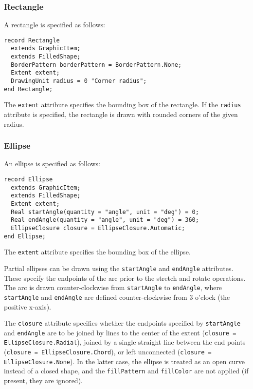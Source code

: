 \subsubsection{Rectangle}\label{rectangle}

A rectangle is specified as follows:
\begin{lstlisting}[language=modelica]
record Rectangle
  extends GraphicItem;
  extends FilledShape;
  BorderPattern borderPattern = BorderPattern.None;
  Extent extent;
  DrawingUnit radius = 0 "Corner radius";
end Rectangle;
\end{lstlisting}%
The \lstinline!extent! attribute specifies the bounding box of the rectangle.
If the \lstinline!radius! attribute is specified, the rectangle is drawn with rounded corners of the given radius.

\subsubsection{Ellipse}\label{ellipse}

An ellipse is specified as follows:
\begin{lstlisting}[language=modelica]
record Ellipse
  extends GraphicItem;
  extends FilledShape;
  Extent extent;
  Real startAngle(quantity = "angle", unit = "deg") = 0;
  Real endAngle(quantity = "angle", unit = "deg") = 360;
  EllipseClosure closure = EllipseClosure.Automatic;
end Ellipse;
\end{lstlisting}%
The \lstinline!extent! attribute specifies the bounding box of the ellipse.

Partial ellipses can be drawn using the \lstinline!startAngle! and \lstinline!endAngle! attributes.
These specify the endpoints of the arc prior to the stretch and rotate operations.
The arc is drawn counter-clockwise from \lstinline!startAngle! to \lstinline!endAngle!, where \lstinline!startAngle! and \lstinline!endAngle! are defined counter-clockwise from 3 o'clock (the positive x-axis).

The \lstinline!closure! attribute specifies whether the endpoints specified by \lstinline!startAngle! and \lstinline!endAngle! are to be joined by lines to the center of the extent (\lstinline!closure = EllipseClosure.Radial!), joined by a single straight line between the end points (\lstinline!closure = EllipseClosure.Chord!), or left unconnected (\lstinline!closure = EllipseClosure.None!).
In the latter case, the ellipse is treated as an open curve instead of a closed shape, and the \lstinline!fillPattern! and \lstinline!fillColor! are not applied (if present, they are ignored).

